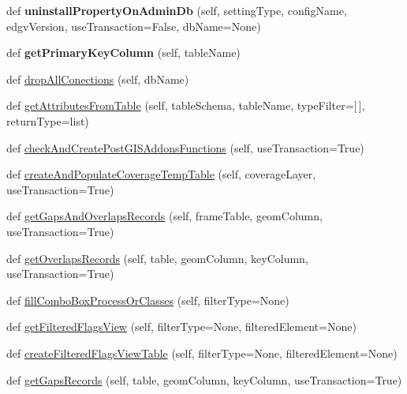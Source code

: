 \begin{DoxyCompactItemize}
def {\bfseries uninstall\+Property\+On\+Admin\+Db} (self, setting\+Type, config\+Name, edgv\+Version, use\+Transaction=False, db\+Name=None)
\item 
\mbox{\label{class_dsg_tools_1_1_factories_1_1_db_factory_1_1postgis_db_1_1_postgis_db_ac58fc556c0253143f06ea17f54a607db}} 
def {\bfseries get\+Primary\+Key\+Column} (self, table\+Name)
\item 
def \mbox{\hyperlink{class_dsg_tools_1_1_factories_1_1_db_factory_1_1postgis_db_1_1_postgis_db_a6dd38e550a884054ab70550fcd714c32}{drop\+All\+Conections}} (self, db\+Name)
\item 
def \mbox{\hyperlink{class_dsg_tools_1_1_factories_1_1_db_factory_1_1postgis_db_1_1_postgis_db_a80b242158d478b0ee5ebb58f31a13be5}{get\+Attributes\+From\+Table}} (self, table\+Schema, table\+Name, type\+Filter=\mbox{[}$\,$\mbox{]}, return\+Type=\textquotesingle{}list\textquotesingle{})
\item 
def \mbox{\hyperlink{class_dsg_tools_1_1_factories_1_1_db_factory_1_1postgis_db_1_1_postgis_db_abf29f610d79818e71520eaa4d85b47bb}{check\+And\+Create\+Post\+G\+I\+S\+Addons\+Functions}} (self, use\+Transaction=True)
\item 
def \mbox{\hyperlink{class_dsg_tools_1_1_factories_1_1_db_factory_1_1postgis_db_1_1_postgis_db_adc158f918b2a4eb2227ff07a6a6987c5}{create\+And\+Populate\+Coverage\+Temp\+Table}} (self, coverage\+Layer, use\+Transaction=True)
\item 
def \mbox{\hyperlink{class_dsg_tools_1_1_factories_1_1_db_factory_1_1postgis_db_1_1_postgis_db_a2d6da09a9c52e785bef17b0e9c2d7d32}{get\+Gaps\+And\+Overlaps\+Records}} (self, frame\+Table, geom\+Column, use\+Transaction=True)
\item 
def \mbox{\hyperlink{class_dsg_tools_1_1_factories_1_1_db_factory_1_1postgis_db_1_1_postgis_db_ad78e09592b69cb6c6c4ff584d56f4c4d}{get\+Overlaps\+Records}} (self, table, geom\+Column, key\+Column, use\+Transaction=True)
\item 
def \mbox{\hyperlink{class_dsg_tools_1_1_factories_1_1_db_factory_1_1postgis_db_1_1_postgis_db_a9fdc672cb1a4843cd39798739f33d2f9}{fill\+Combo\+Box\+Process\+Or\+Classes}} (self, filter\+Type=None)
\item 
def \mbox{\hyperlink{class_dsg_tools_1_1_factories_1_1_db_factory_1_1postgis_db_1_1_postgis_db_a896ec652f3cbba47db10350f8d3ea7bb}{get\+Filtered\+Flags\+View}} (self, filter\+Type=None, filtered\+Element=None)
\item 
def \mbox{\hyperlink{class_dsg_tools_1_1_factories_1_1_db_factory_1_1postgis_db_1_1_postgis_db_a83a30c916b02c4ad03dc5dccd7f7e25a}{create\+Filtered\+Flags\+View\+Table}} (self, filter\+Type=None, filtered\+Element=None)
\item 
def \mbox{\hyperlink{class_dsg_tools_1_1_factories_1_1_db_factory_1_1postgis_db_1_1_postgis_db_a650039fe21c0c2ecf52984150a7e12e8}{get\+Gaps\+Records}} (self, table, geom\+Column, key\+Column, use\+Transaction=True)
\end{DoxyCompactItemize}
